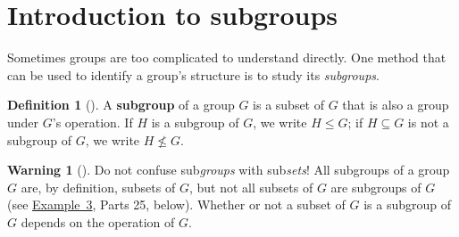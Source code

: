\documentclass[10pt,openany,oneside]{book}
\newcommand{\terminology}[1]{\textbf{#1}}
\theoremstyle{plain}
\theoremstyle{definition}
\newtheorem{definition}[theorem]{Definition}
\theoremstyle{definition}
\newtheorem{warning}[theorem]{Warning}
\theoremstyle{definition}
\theoremstyle{definition}
\numberwithin{equation}{section}
\begin{document}
\section[{Introduction to subgroups}]{Introduction to subgroups}\label{section-13}
Sometimes groups are too complicated to understand directly. One method that can be used to identify a group's structure is to study its \emph{subgroups}.%
\begin{definition}[{}]\label{definition-35}
\label{notation-52}
\label{notation-53}
A \terminology{subgroup} of a group \(G\) is a subset of \(G\) that is also a group under \(G\)'s operation. If \(H\) is a subgroup of \(G\), we write \(H \leq G\); if \(H\subseteq G\) is not a subgroup of \(G\), we write \(H\not\leq G\).%
\end{definition}
\begin{warning}[]\label{warning-14}
Do not confuse sub\emph{groups} with sub\emph{sets}! All subgroups of a group \(G\) are, by definition, subsets of \(G\), but not all subsets of \(G\) are subgroups of \(G\) (see \hyperref[subsetvsubgp1]{Example~3}, Parts 2\textendash{}5, below). Whether or not a subset of \(G\) is a subgroup of \(G\) depends on the operation of \(G\).%
\end{warning}
\end{document}
